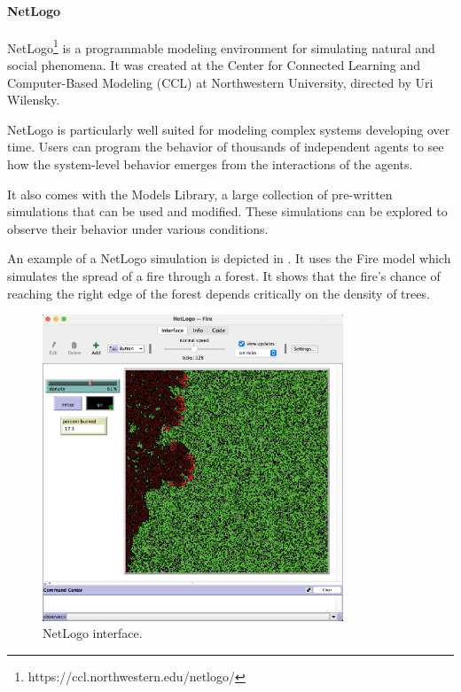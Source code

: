 \documentclass[12pt,a4paper,openright,twoside]{book}
\begin{document}
\paragraph*{NetLogo}

NetLogo\footnote{https://ccl.northwestern.edu/netlogo/} is a programmable modeling environment for simulating natural and social phenomena. It was created at the Center
for Connected Learning and Computer-Based Modeling (CCL) at Northwestern University, directed by Uri Wilensky.

NetLogo is particularly well suited for modeling complex systems developing over time.
Users can program the behavior of thousands of independent agents to see how the system-level behavior emerges from the interactions of the agents.

It also comes with the Models Library, a large collection of pre-written simulations that can be used and modified.
These simulations can be explored to observe their behavior under various conditions.

An example of a NetLogo simulation is depicted in .
It uses the Fire model which simulates the spread of a fire through a forest. 
It shows that the fire's chance of reaching the right edge of the forest depends critically on the density of trees.

\begin{figure}[h!]
  \centering
  \includegraphics[width=0.8\textwidth]{figures/NetLogo-interface.png}
  \caption{NetLogo interface.}
  \label{fig:netlogo-simulation}
\end{figure}
\end{document}
